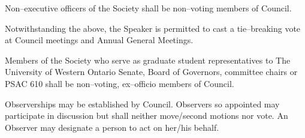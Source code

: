 \begin{longenum}[label*=\thesubsection.\arabic*., align=left]
    \item Non--executive officers of the Society shall be non--voting members of Council. 
    	\begin{longenum}[label*=\arabic*., align=left]
    \item Notwithstanding the above, the Speaker is permitted to cast a tie--breaking vote at Council meetings and Annual General Meetings.
  	\end{longenum}
    \item Members of the Society who serve as graduate student representatives to The University of Western Ontario Senate, Board of Governors, committee chairs or PSAC 610  shall be non--voting, ex--officio members of Council.
    \item Observerships may be established by Council. Observers so appointed may participate in discussion but shall neither move/second motions nor vote. An Observer may designate a person to act on her/his behalf. 
\end{longenum}



